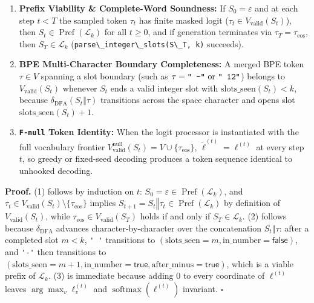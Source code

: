 \documentclass[
  11pt,
]{article}
\newcommand{\passthrough}[1]{#1}
\providecommand{\tightlist}{%
  \setlength{\itemsep}{0pt}\setlength{\parskip}{0pt}}
\begin{document}
\begin{enumerate}
\def\labelenumi{\arabic{enumi}.}
\tightlist
\item
  \textbf{Prefix Viability \& Complete-Word Soundness:} If
  \(S_0 = \varepsilon\) and at each step \(t < T\) the sampled token
  \(\tau_t\) has finite masked logit
  (\(\tau_t \in V_{\text{valid}}(S_t)\)), then
  \(S_t \in \operatorname{Pref}(\mathcal{L}_k)\) for all \(t \ge 0\),
  and if generation terminates via \(\tau_T = \tau_{\text{eos}}\), then
  \(S_T \in \mathcal{L}_k\)
  (\passthrough{\lstinline!parse\_integer\_slots(S\_T, k)!} succeeds).
\item
  \textbf{BPE Multi-Character Boundary Completeness:} A merged BPE token
  \(\tau \in V\) spanning a slot boundary (such as
  \(\tau = \text{\texttt{" -"}}\text{ or }\text{\texttt{" 12"}}\))
  belongs to \(V_{\text{valid}}(S_t)\) whenever \(S_t\) ends a valid
  integer slot with \(\text{slots\_seen}(S_t) < k\), because
  \(\delta_{\text{DFA}}(S_t \mathbin{\Vert} \tau)\) transitions across
  the space character and opens slot \(\text{slots\_seen}(S_t) + 1\).
\item
  \textbf{\passthrough{\lstinline!F-null!} Token Identity:} When the
  logit processor is instantiated with the full vocabulary frontier
  \(V_{\text{valid}}^{\text{null}}(S_t) = V \cup \{\tau_{\text{eos}}\}\),
  \(\tilde{\ell}^{(t)} = \ell^{(t)}\) at every step \(t\), so greedy or
  fixed-seed decoding produces a token sequence identical to unhooked
  decoding.
\end{enumerate}

\textbf{Proof.} (1) follows by induction on \(t\):
\(S_0 = \varepsilon \in \operatorname{Pref}(\mathcal{L}_k)\), and
\(\tau_t \in V_{\text{valid}}(S_t) \setminus \{\tau_{\text{eos}}\}\)
implies
\(S_{t+1} = S_t \mathbin{\Vert} \tau_t \in \operatorname{Pref}(\mathcal{L}_k)\)
by definition of \(V_{\text{valid}}(S_t)\), while
\(\tau_{\text{eos}} \in V_{\text{valid}}(S_T)\) holds if and only if
\(S_T \in \mathcal{L}_k\). (2) follows because \(\delta_{\text{DFA}}\)
advances character-by-character over the concatenation
\(S_t \mathbin{\Vert} \tau\): after a completed slot \(m < k\),
\passthrough{\lstinline!' '!} transitions to
\((\text{slots\_seen}=m,\allowbreak  \text{in\_number}=\mathsf{false})\),
and \passthrough{\lstinline!'-'!} then transitions to
\((\text{slots\_seen}=m+1,\allowbreak  \text{in\_number}=\mathsf{true},\allowbreak  \text{after\_minus}=\mathsf{true})\),
which is a viable prefix of \(\mathcal{L}_k\). (3) is immediate because
adding \(0\) to every coordinate of \(\ell^{(t)}\) leaves
\(\arg\max_v \ell^{(t)}_v\) and \(\operatorname{softmax}(\ell^{(t)})\)
invariant. \(\square\)
\end{document}
